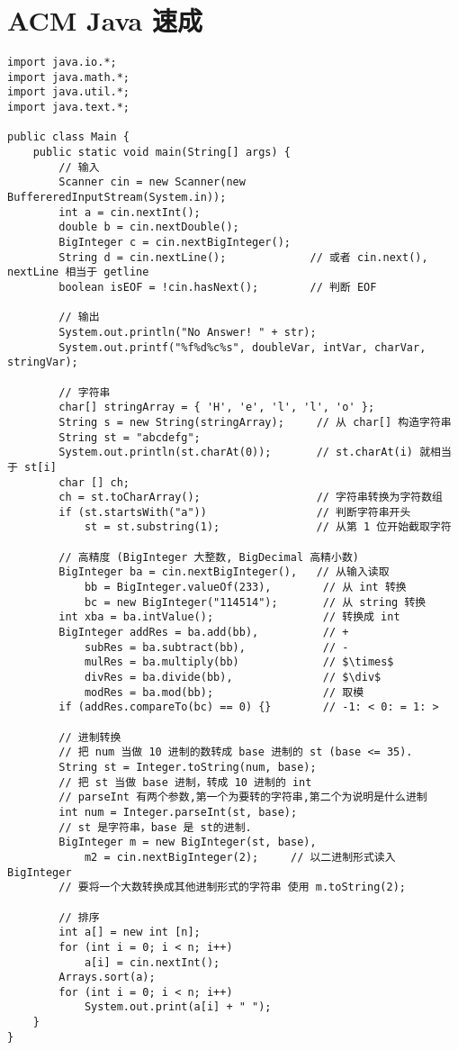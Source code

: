 \section{ACM Java 速成}

\begin{verbatim}
import java.io.*;
import java.math.*;
import java.util.*;
import java.text.*;

public class Main {
    public static void main(String[] args) {
        // 输入
        Scanner cin = new Scanner(new BuffereredInputStream(System.in));
        int a = cin.nextInt();
        double b = cin.nextDouble();
        BigInteger c = cin.nextBigInteger();
        String d = cin.nextLine();             // 或者 cin.next(), nextLine 相当于 getline
        boolean isEOF = !cin.hasNext();        // 判断 EOF

        // 输出
        System.out.println("No Answer! " + str);
        System.out.printf("%f%d%c%s", doubleVar, intVar, charVar, stringVar);

        // 字符串
        char[] stringArray = { 'H', 'e', 'l', 'l', 'o' };
        String s = new String(stringArray);     // 从 char[] 构造字符串
        String st = "abcdefg";
        System.out.println(st.charAt(0));       // st.charAt(i) 就相当于 st[i]
        char [] ch;
        ch = st.toCharArray();                  // 字符串转换为字符数组
        if (st.startsWith("a"))                 // 判断字符串开头
            st = st.substring(1);               // 从第 1 位开始截取字符

        // 高精度 (BigInteger 大整数, BigDecimal 高精小数)
        BigInteger ba = cin.nextBigInteger(),   // 从输入读取
            bb = BigInteger.valueOf(233),        // 从 int 转换
            bc = new BigInteger("114514");       // 从 string 转换
        int xba = ba.intValue();                 // 转换成 int
        BigInteger addRes = ba.add(bb),          // +
            subRes = ba.subtract(bb),            // -
            mulRes = ba.multiply(bb)             // $\times$
            divRes = ba.divide(bb),              // $\div$
            modRes = ba.mod(bb);                 // 取模
        if (addRes.compareTo(bc) == 0) {}        // -1: < 0: = 1: >

        // 进制转换
        // 把 num 当做 10 进制的数转成 base 进制的 st (base <= 35).
        String st = Integer.toString(num, base);
        // 把 st 当做 base 进制，转成 10 进制的 int
        // parseInt 有两个参数,第一个为要转的字符串,第二个为说明是什么进制  
        int num = Integer.parseInt(st, base); 
        // st 是字符串，base 是 st的进制.
        BigInteger m = new BigInteger(st, base),
            m2 = cin.nextBigInteger(2);     // 以二进制形式读入 BigInteger
        // 要将一个大数转换成其他进制形式的字符串 使用 m.toString(2);

        // 排序
        int a[] = new int [n];
        for (int i = 0; i < n; i++)
            a[i] = cin.nextInt();
        Arrays.sort(a);
        for (int i = 0; i < n; i++)
            System.out.print(a[i] + " ");
    }
}
\end{verbatim}